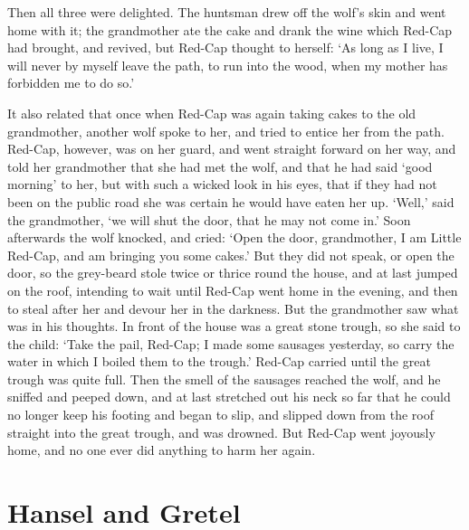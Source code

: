 \documentclass[oneside,11pt]{book} %
\begin{document}
Then all three were delighted. The huntsman drew off the wolf's skin and went home with it; the grandmother ate the cake and drank the wine which Red-Cap had brought, and revived, but Red-Cap thought to herself: `As long as I live, I will never by myself leave the path, to run into the wood, when my mother has forbidden me to do so.'

It also related that once when Red-Cap was again taking cakes to the old grandmother, another wolf spoke to her, and tried to entice her from the path. Red-Cap, however, was on her guard, and went straight forward on her way, and told her grandmother that she had met the wolf, and that he had said `good morning' to her, but with such a wicked look in his eyes, that if they had not been on the public road she was certain he would have eaten her up. `Well,' said the grandmother, `we will shut the door, that he may not come in.' Soon afterwards the wolf knocked, and cried: `Open the door, grandmother, I am Little Red-Cap, and am bringing you some cakes.' But they did not speak, or open the door, so the grey-beard stole twice or thrice round the house, and at last jumped on the roof, intending to wait until Red-Cap went home in the evening, and then to steal after her and devour her in the darkness. But the grandmother saw what was in his thoughts. In front of the house was a great stone trough, so she said to the child: `Take the pail, Red-Cap; I made some sausages yesterday, so carry the water in which I boiled them to the trough.' Red-Cap carried until the great trough was quite full. Then the smell of the sausages reached the wolf, and he sniffed and peeped down, and at last stretched out his neck so far that he could no longer keep his footing and began to slip, and slipped down from the roof straight into the great trough, and was drowned. But Red-Cap went joyously home, and no one ever did anything to harm her again.


\chapter{Hansel and Gretel}
\end{document}
